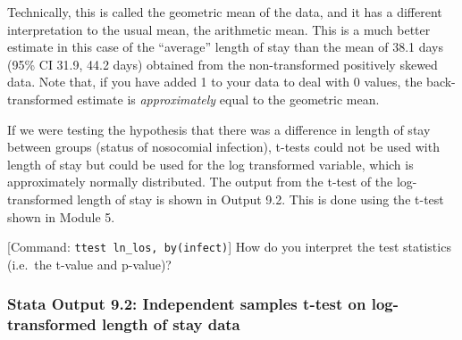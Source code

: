 \documentclass[
]{memoir}
\begin{document}
Technically, this is called the geometric mean of the data, and it has a different interpretation to the usual mean, the arithmetic mean. This is a much better estimate in this case of the ``average'' length of stay than the mean of 38.1 days (95\% CI 31.9, 44.2 days) obtained from the non-transformed positively skewed data. Note that, if you have added 1 to your data to deal with 0 values, the back-transformed estimate is \emph{approximately} equal to the geometric mean.

If we were testing the hypothesis that there was a difference in length of stay between groups (status of nosocomial infection), t-tests could not be used with length of stay but could be used for the log transformed variable, which is approximately normally distributed. The output from the t-test of the log-transformed length of stay is shown in Output 9.2. This is done using the t-test shown in Module 5.

{[}Command: \texttt{ttest\ ln\_los,\ by(infect)}{]} How do you interpret the test statistics (i.e.~the t-value and p-value)?

\hypertarget{stata-output-9.2-independent-samples-t-test-on-log-transformed-length-of-stay-data}{%
\subsubsection*{Stata Output 9.2: Independent samples t-test on log-transformed length of stay data}\label{stata-output-9.2-independent-samples-t-test-on-log-transformed-length-of-stay-data}}
\end{document}
